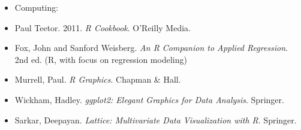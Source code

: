 \documentclass{article}
\begin{document}
\begin{itemize}
\item[] Computing:
\item Paul Teetor. 2011. \emph{R Cookbook}. O'Reilly Media.
\item Fox, John and Sanford Weisberg. \emph{An R Companion to Applied Regression}. 2nd ed. (R, with focus on regression modeling)
\item Murrell, Paul. \emph{R Graphics}. Chapman \& Hall.
\item Wickham, Hadley. \emph{ggplot2: Elegant Graphics for Data Analysis}. Springer.
\item Sarkar, Deepayan. \emph{Lattice: Multivariate Data Visualization with R}. Springer.
\end{itemize}





%
\end{document}
